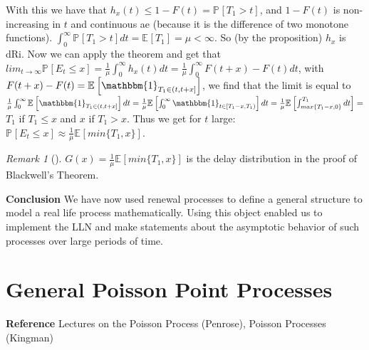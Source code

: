 \documentclass[12pt]{book}
\theoremstyle{definition}
\theoremstyle{remark}
\newtheorem{rmk}[theorem]{Remark}
\begin{document}
With this we have that $h_x(t) \leq 1 - F(t) = \mathbb{P}_{} \left[ T_1 > t \right] $, and $1-F(t)$ is non-increasing in $t$ and continuous ae (because it is the difference of two monotone functions). $\int_{0}^{\infty} \mathbb{P}_{} \left[ T_1 > t \right] dt = \mathbb{E}_{} \left[ T_1 \right] = \mu < \infty $. So (by the proposition) $h_x$ is dRi. Now we can apply the theorem and get that $lim_{t \to \infty} \mathbb{P}_{} \left[ E_t \leq x \right] = \frac{1}{\mu } \int_{0}^{\infty} h_x(t)dt = \frac{1}{\mu } \int_{0}^{\infty} F(t+x) - F(t) dt$, with $F(t+x) - F(t) = \mathbb{E}_{} \left[ \mathbbm{1}_{T_1 \in (t, t+x]} \right] $, we find that the limit is equal to $\frac{1}{\mu } \int_{0}^{\infty} \mathbb{E}_{} \left[ \mathbbm{1}_{T_1 \in (t, t+x]} \right]dt = \frac{1}{\mu} \mathbb{E}_{} \left[ \int_{0}^{ \infty } \mathbbm{1}_{t \in [T_1 -x, T_1)}    \right]dt = \frac{1}{\mu } \mathbb{E}_{} \left[ \int_{max\{T_1-x, 0\}}^{T_1} dt \right] =  $ $T_1$ if $T_1 \leq x$ and $x$ if  $T_1 > x$. Thus we get for $t$ large:  $\mathbb{P}_{} \left[ E_t \leq x \right] \approx  \frac{1}{\mu} \mathbb{E}_{} \left[ min\{T_1, x\} \right]  $. 

\begin{rmk}[]
	$G(x) = \frac{1}{\mu } \mathbb{E}_{} \left[ min\{T_1, x\} \right] $ is the delay distribution in the proof of Blackwell's Theorem.
\end{rmk}

\noindent \textbf{Conclusion} We have now used renewal processes to define a general structure to model a real life process mathematically. Using this object enabled us to implement the LLN and make statements about the asymptotic behavior of such processes over large periods of time.

\section{General Poisson Point Processes}
\textbf{Reference} Lectures on the Poisson Process (Penrose), Poisson Processes (Kingman)
\end{document}
